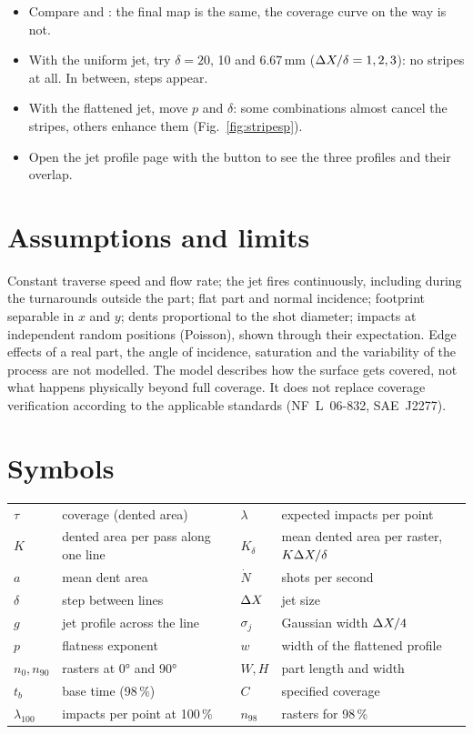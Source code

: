 \documentclass[11pt,a4paper]{article}
\begin{document}
\begin{trybox}
\begin{itemize}[nosep,leftmargin=*]
\item Compare  and : the final map is the same, the coverage curve on the way is not.
\item With the uniform jet, try $\delta=20$, 10 and 6.67\,mm ($\Delta X/\delta=1,2,3$): no stripes at all. In between, steps appear.
\item With the flattened jet, move $p$ and $\delta$: some combinations almost cancel the stripes, others enhance them (Fig.~\ref{fig:stripesp}).
\item Open the jet profile page with the  button to see the three profiles and their overlap.
\end{itemize}
\end{trybox}

\section{Assumptions and limits}

Constant traverse speed and flow rate; the jet fires continuously, including during the turnarounds outside the part; flat part and normal incidence; footprint separable in $x$ and $y$; dents proportional to the shot diameter; impacts at independent random positions (Poisson), shown through their expectation. Edge effects of a real part, the angle of incidence, saturation and the variability of the process are not modelled. The model describes how the surface gets covered, not what happens physically beyond full coverage. It does not replace coverage verification according to the applicable standards (NF~L~06-832, SAE~J2277).

\appendix
\section{Symbols}
\begin{tabular}{@{}ll@{\qquad}ll@{}}
$\tau$ & coverage (dented area) & $\lambda$ & expected impacts per point\\
$K$ & dented area per pass along one line & $K_\delta$ & mean dented area per raster, $K\Delta X/\delta$\\
$a$ & mean dent area & $\dot N$ & shots per second\\
$\delta$ & step between lines & $\Delta X$ & jet size\\
$g$ & jet profile across the line & $\sigma_j$ & Gaussian width $\Delta X/4$\\
$p$ & flatness exponent & $w$ & width of the flattened profile\\
$n_0,n_{90}$ & rasters at 0° and 90° & $W,H$ & part length and width\\
$t_b$ & base time (98\,\%) & $C$ & specified coverage\\
$\lambda_{100}$ & impacts per point at 100\,\% & $n_{98}$ & rasters for 98\,\%\\
\end{tabular}
\end{document}

